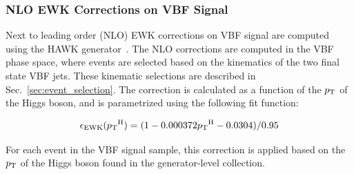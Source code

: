 \clearpage

\subsubsection{NLO EWK Corrections on VBF Signal}
\label{subsubsec:vbf_nlo_ewk}

Next to leading order (NLO) EWK corrections on VBF signal are computed using the HAWK generator~\cite{HAWKGenerator}. 
The NLO corrections are computed in the VBF phase space, where events are selected based on the kinematics of the two final state VBF jets.
These kinematic selections are described in Sec.~\ref{sec:event_selection}.
The correction is calculated as a function of the $p_{\textrm{T}}$ of the Higgs boson, and is parametrized using the following fit function:

\begin{equation}
    \epsilon_{\textrm{EWK}}({p_{\textrm{T}}}^{\textrm{H}}) = (1 - 0.000372 {p_{\textrm{T}}}^{\textrm{H}} - 0.0304) / 0.95
\end{equation}

For each event in the VBF signal sample, this correction is applied based on the $p_{\textrm{T}}$ of the Higgs boson found in the generator-level collection.
